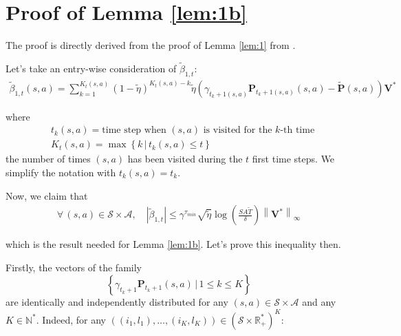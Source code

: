 
\chapter{Proof of Lemma \ref{lem:1b}} %
\label{AppendixA} %

The proof is directly derived from the proof of Lemma \ref{lem:1} from \citep{li_sample_2021}.

Let's take an entry-wise consideration of $\tilde\beta_{1,t}$:
\begin{align}
  \tilde\beta_{1,t} (s,a) = \sum_{k = 1}^{K_t(s,a)}(1- \tilde\eta)^{K_t(s,a) - k}\tilde\eta(\gamma_{t_k+1(s,a)} \mathbf{P}_{t_k+1(s,a)}(s,a) - \tilde{\mathbf{P}}(s,a))\mathbf{V}^*
\end{align}

where
\begin{align}
  &t_k(s,a) = \text{time step when }(s,a) \text{ is visited for the }k\text{-th time}\\
  &K_t(s,a) = \max \left\{ k \,|\, t_k(s,a) \leq t \right\}
\end{align}
the number of times $(s,a)$ has been visited during the $t$ first time steps. We simplify the notation with $t_k(s,a) = t_k$.

Now, we claim that
\begin{align}
  \forall \, (s,a)\in \mathcal{S}\times \mathcal{A},\quad \left| \tilde\beta_{1,t} \right| \leq \gamma^{\tau_{min}}\sqrt{\tilde\eta} \log\left( \frac{SA\tilde T}{\delta} \right) \left\| \mathbf{V}^* \right\|_\infty
\end{align}

which is the result needed for Lemma \ref{lem:1b}. Let's prove this inequality then.

Firstly, the vectors of the family $$\left\{ \gamma_{t_k+1} \mathbf{P}_{t_k+1}(s,a) \,|\, 1\leq k\leq K\right\}$$ are identically and independently distributed for any $(s,a) \in \mathcal{S}\times \mathcal{A}$ and any $K\in \mathbb{N}^*$. Indeed, for any $((i_1, l_1), \dots, (i_K, l_K)) \in (\mathcal{S}\times \mathbb{R}_+^*)^K$:


